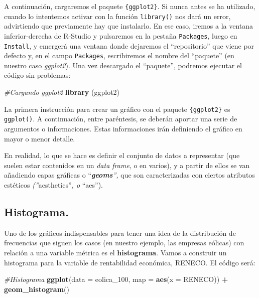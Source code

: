 \documentclass[
]{book}
\newenvironment{Shaded}{\begin{snugshade}}{\end{snugshade}}
\newcommand{\AttributeTok}[1]{\textcolor[rgb]{0.13,0.29,0.53}{#1}}
\newcommand{\CommentTok}[1]{\textcolor[rgb]{0.56,0.35,0.01}{\textit{#1}}}
\newcommand{\FunctionTok}[1]{\textcolor[rgb]{0.13,0.29,0.53}{\textbf{#1}}}
\newcommand{\NormalTok}[1]{#1}
\newcommand{\SpecialCharTok}[1]{\textcolor[rgb]{0.81,0.36,0.00}{\textbf{#1}}}
\begin{document}
A continuación, cargaremos el paquete \texttt{\{ggplot2\}}. Si nunca antes se ha utilizado, cuando lo intentemos activar con la función \texttt{library()} nos dará un error, advirtiendo que previamente hay que instalarlo. En ese caso, iremos a la ventana inferior-derecha de R-Studio y pulsaremos en la pestaña \texttt{Packages}, luego en \texttt{Install}, y emergerá una ventana donde dejaremos el ``repositorio'' que viene por defecto y, en el campo \texttt{Packages}, escribiremos el nombre del ``paquete'' (en nuestro caso \emph{ggplot2}). Una vez descargado el ``paquete'', podremos ejecutar el código sin problemas:

\begin{Shaded}
\begin{Highlighting}[]
\CommentTok{\#Cargando ggplot2}
\FunctionTok{library}\NormalTok{ (ggplot2)}
\end{Highlighting}
\end{Shaded}

La primera instrucción para crear un gráfico con el paquete \texttt{\{ggplot2\}} es \texttt{ggplot()}. A continuación, entre paréntesis, se deberán aportar una serie de argumentos o informaciones. Estas informaciones irán definiendo el gráfico en mayor o menor detalle.

En realidad, lo que se hace es definir el conjunto de datos a representar (que suelen estar contenidos en un \emph{data frame}, o en varios), y a partir de ellos se van añadiendo capas gráficas o ``\emph{\textbf{geoms}'',} que son caracterizadas con ciertos atributos estéticos \emph{(''}aesthetics''\emph{, o} ``aes'').

\subsection{Histograma.}\label{histograma.}

Uno de los gráficos indispensables para tener una idea de la distribución de frecuencias que siguen los casos (en nuestro ejemplo, las empresas eólicas) con relación a una variable métrica es el \textbf{histograma}. Vamos a construir un histograma para la variable de rentabilidad económica, RENECO. El código será:

\begin{Shaded}
\begin{Highlighting}[]
\CommentTok{\#Histograma}
\FunctionTok{ggplot}\NormalTok{(}\AttributeTok{data =}\NormalTok{ eolica\_100, }\AttributeTok{map =} \FunctionTok{aes}\NormalTok{(}\AttributeTok{x =}\NormalTok{ RENECO)) }\SpecialCharTok{+}
       \FunctionTok{geom\_histogram}\NormalTok{()}
\end{Highlighting}
\end{Shaded}
\end{document}

